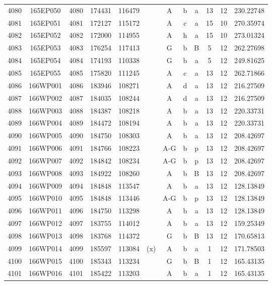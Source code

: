 \begin{tabular}{|*{12}{c|}}
4080 & 165EP050 & 4080 & 174431 & 116479 &  & A & b & a & 13 & 12 & 230.22748 \\ 
4081 & 165EP051 & 4081 & 172127 & 115172 &  & A & c & a & 15 & 10 & 270.35974 \\ 
4082 & 165EP052 & 4082 & 172000 & 114955 &  & A & h & a & 15 & 10 & 273.01324 \\ 
4083 & 165EP053 & 4083 & 176254 & 117413 &  & G & b & B & 5 & 12 & 262.27698 \\ 
4084 & 165EP054 & 4084 & 174193 & 110338 &  & G & b & a & 5 & 12 & 249.81625 \\ 
4085 & 165EP055 & 4085 & 175820 & 111245 &  & A & c & a & 13 & 12 & 262.71866 \\ 
4086 & 166WP001 & 4086 & 183946 & 108271 &  & A & d & a & 13 & 12 & 216.27509 \\ 
4087 & 166WP002 & 4087 & 184035 & 108244 &  & A & d & a & 13 & 12 & 216.27509 \\ 
4088 & 166WP003 & 4088 & 184387 & 108218 &  & A & b & a & 13 & 12 & 220.33731 \\ 
4089 & 166WP004 & 4089 & 184472 & 108194 &  & A & b & a & 13 & 12 & 220.33731 \\ 
4090 & 166WP005 & 4090 & 184750 & 108303 &  & A & b & a & 13 & 12 & 208.42697 \\ 
4091 & 166WP006 & 4091 & 184766 & 108223 &  & A-G & b & p & 13 & 12 & 208.42697 \\ 
4092 & 166WP007 & 4092 & 184842 & 108234 &  & A-G & b & p & 13 & 12 & 208.42697 \\ 
4093 & 166WP008 & 4093 & 184922 & 108260 &  & A & b & B & 13 & 12 & 208.42697 \\ 
4094 & 166WP009 & 4094 & 184848 & 113547 &  & A & b & a & 13 & 12 & 128.13849 \\ 
4095 & 166WP010 & 4095 & 184848 & 113446 &  & A-G & b & p & 13 & 12 & 128.13849 \\ 
4096 & 166WP011 & 4096 & 184750 & 113298 &  & A & b & a & 13 & 12 & 128.13849 \\ 
4097 & 166WP012 & 4097 & 183755 & 114012 &  & A & b & a & 13 & 12 & 159.25349 \\ 
4098 & 166WP013 & 4098 & 183768 & 114372 &  & G & b & B & 13 & 12 & 170.65813 \\ 
4099 & 166WP014 & 4099 & 185597 & 113084 & (x) & A & b & a & 1 & 12 & 171.78503 \\ 
4100 & 166WP015 & 4100 & 185343 & 113234 &  & G & b & B & 1 & 12 & 165.43135 \\ 
4101 & 166WP016 & 4101 & 185422 & 113203 &  & A & b & a & 1 & 12 & 165.43135 \\ 

\end{tabular}
